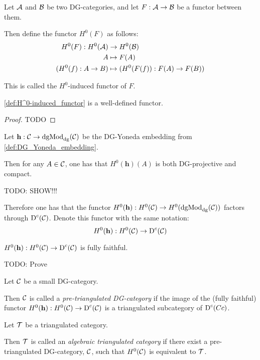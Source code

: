 \begin{definition}
    \label{def:H^0-induced_functor}
    Let \( {\mathcal{A}} \) and \( {\mathcal{B}} \) be two DG-categories, and let \( F: {\mathcal{A}} \to {\mathcal{B}} \) be a functor between them.

    Then define the functor \( H^0(F) \) as follows:
    \begin{align*}
        H^0(F): H^0({\mathcal{A}}) &\to H^0({\mathcal{B}}) \\
        A &\mapsto F(A) \\
        (H^0(f): A \to B) &\mapsto (H^0(F(f)): F(A) \to F(B)) 
    \end{align*}

    This is called the \( H^0 \)-induced functor of \( F \).
\end{definition}

\begin{theorem}
    \autoref{def:H^0-induced_functor} is a well-defined functor.
\end{theorem}
\begin{proof}
    TODO
\end{proof}

\begin{remark}
    Let \( \mathbf{h}: {\mathcal{C}} \to \operatorname{dgMod}_{\operatorname{dg}}({\mathcal{C}}) \) be the DG-Yoneda embedding from \autoref{def:DG_Yoneda_embedding}.

    Then for any \( A \in {\mathcal{C}} \), one has that \( H^0(\mathbf{h})(A) \) is both DG-projective and compact.
    
    TODO: SHOW!!!

    Therefore one has that the functor \( H^0(\mathbf{h}): H^0({\mathcal{C}}) \to H^0(\operatorname{dgMod}_{\operatorname{dg}}({\mathcal{C}})) \) factors through \( \operatorname{D}^c({\mathcal{C}}) \). Denote this functor with the same notation:
    \[
        H^0(\mathbf{h}): H^0({\mathcal{C}}) \to \operatorname{D}^c({\mathcal{C}})
    \]
\end{remark}

\begin{remark}
    \( H^0(\mathbf{h}): H^0({\mathcal{C}}) \to \operatorname{D}^c({\mathcal{C}}) \) is fully faithful.

    TODO: Prove
\end{remark}

\begin{definition}
    Let \( {\mathcal{C}} \) be a small DG-category.

    Then \( {\mathcal{C}} \) is called a \emph{pre-triangulated DG-category} if the image of the (fully faithful) functor \( H^0(\mathbf{h}): H^0({\mathcal{C}}) \to \operatorname{D}^c({\mathcal{C}}) \) is a triangulated subcategory of \( \operatorname{D}^c(Cc) \).
\end{definition}

\begin{definition}
    Let \( {\mathcal{T}} \) be a triangulated category.

    Then \( {\mathcal{T}} \) is called an \emph{algebraic triangulated category} if there exist a pre-triangulated DG-category, \( {\mathcal{C}} \), such that \( H^0({\mathcal{C}}) \) is equivalent to \( {\mathcal{T}} \).
\end{definition}